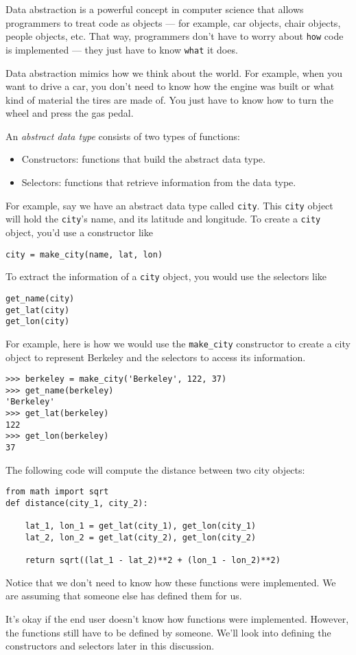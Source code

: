 Data abstraction is a powerful concept in computer science that
allows programmers to treat code as objects --- for example,
car objects, chair objects, people objects, etc. That way,
programmers don't have to worry about \texttt {how} code is
implemented --- they just have to know \texttt{what} it does.

Data abstraction mimics how we think about the world. For example,
when you want to drive a car, you don't need to know how the
engine was built or what kind of material the tires are made of.
You just have to know how to turn the wheel and press the gas pedal.

An \textit{abstract data type} consists of two types of functions:
\begin{itemize}
\item
Constructors: functions that build the abstract data type.
\item
Selectors: functions that retrieve information from the data type.
\end{itemize}
For example, say we have an abstract data type called {\tt city}.
This {\tt city} object will hold the {\tt city}'s name, and
its latitude and longitude. To create a {\tt city} object,
you'd use a constructor like

\begin{lstlisting}
city = make_city(name, lat, lon)
\end{lstlisting}

To extract the information of a {\tt city} object, you would use the selectors like

\begin{lstlisting}
get_name(city)
get_lat(city)
get_lon(city)
\end{lstlisting}

For example, here is how we would use the {\tt make\_city} constructor to create a city object to represent Berkeley
and the selectors to access its information.

\begin{lstlisting}
>>> berkeley = make_city('Berkeley', 122, 37)
>>> get_name(berkeley)
'Berkeley'
>>> get_lat(berkeley)
122
>>> get_lon(berkeley)
37
\end{lstlisting}

The following code will compute the distance between two city objects:

\begin{lstlisting}
from math import sqrt
def distance(city_1, city_2):

    lat_1, lon_1 = get_lat(city_1), get_lon(city_1)
    lat_2, lon_2 = get_lat(city_2), get_lon(city_2)

    return sqrt((lat_1 - lat_2)**2 + (lon_1 - lon_2)**2)
\end{lstlisting}

Notice that we don't need to know how these functions were implemented.  We are
assuming that someone else has defined them for us.

It's okay if the end user doesn't know how functions were implemented.  However,
the functions still have to be defined by someone. We'll look into defining the
constructors and selectors later in this discussion.

